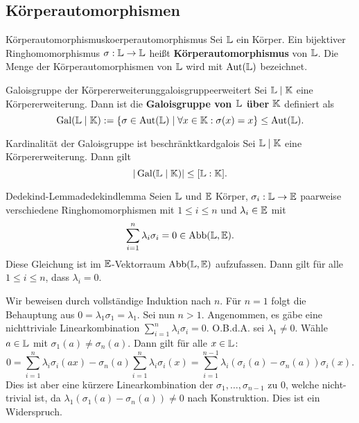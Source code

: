 \subsection{Körperautomorphismen}
\label{subsec:koerperautomorphismen}
\begin{definition}{Körperautomorphismus}{koerperautomorphismus}
Sei $\mathbb{L}$ ein Körper. Ein bijektiver Ringhomomorphismus $\sigma: \mathbb{L} \to \mathbb{L}$ heißt \textbf{Körperautomorphismus} von $\mathbb{L}$. Die Menge der Körperautomorphismen von $\mathbb{L}$ wird mit $\operatorname{\text{Aut}} (\mathbb{L})$ bezeichnet.
\end{definition}
\begin{definition}{Galoisgruppe der Körpererweiterung}{galoisgruppeerweitert}
Sei $\mathbb{L} \mid \mathbb{K}$ eine Körpererweiterung. Dann ist die \textbf{Galoisgruppe von $\mathbb{L}$ über $\mathbb{K}$} definiert als
\begin{equation}
\operatorname{\text{Gal}} (\mathbb{L} \mid \mathbb{K}) := \{\sigma \in \operatorname{\text{Aut}}(\mathbb{L}) \mid \forall x \in \mathbb{K}: \sigma(x) = x \}\leq \operatorname{\text{Aut}}(\mathbb{L}).
\end{equation}
\end{definition}
\begin{satz}{Kardinalität der Galoisgruppe ist beschränkt}{kardgalois}
Sei $\mathbb{L} \mid \mathbb{K}$ eine Körpererweiterung. Dann gilt
\begin{equation}
|\operatorname{\text{Gal}} (\mathbb{L} \mid \mathbb{K})| \leq [\mathbb{L} : \mathbb{K}].
\end{equation}
\end{satz}
\begin{lemma}{Dedekind-Lemma}{dedekindlemma}
Seien $\mathbb{L}$ und $\mathbb{E}$ Körper, $\sigma_i: \mathbb{L} \to \mathbb{E}$ paarweise verschiedene Ringhomomorphismen mit $1 \leq i \leq n$ und $\lambda_i \in \mathbb{E}$ mit
\begin{equation} 
\sum_{i=1}^n \lambda_i \sigma_i =0 \in \text{Abb} (\mathbb{L},\mathbb{E}).
\end{equation}
Diese Gleichung ist im $\mathbb{E}$-Vektorraum $\text{Abb}(\mathbb{L},\mathbb{E})$ aufzufassen. Dann gilt für alle $1 \leq i \leq n$, dass $\lambda_i =0$.
\end{lemma}
\begin{beweis}
Wir beweisen durch vollständige Induktion nach $n$. Für $n=1$ folgt die Behauptung aus $0 = \lambda_1 \sigma_1 = \lambda_1$. Sei nun $n>1$. Angenommen, es gäbe eine nichttriviale Linearkombination $\sum_{i=1}^n \lambda_i \sigma_i = 0$. O.B.d.A. sei $\lambda_1 \neq 0$. Wähle $a \in \mathbb{L}$ mit $\sigma_1(a)\neq \sigma_n(a)$. Dann gilt für alle $x \in \mathbb{L}$:
\begin{equation}
0 = \sum_{i=1}^n \lambda_i \sigma_i (ax) - \sigma_n(a) \sum_{i=1}^n \lambda_i \sigma_i (x) = \sum_{i=1}^{n-1} \lambda_i(\sigma_i(a)-\sigma_n(a))\sigma_i(x).
\end{equation} 
Dies ist aber eine kürzere Linearkombination der $\sigma_1, \dots, \sigma_{n-1}$ zu $0$, welche nicht-trivial ist, da $\lambda_1(\sigma_1(a)-\sigma_n(a))\neq 0$ nach Konstruktion. Dies ist ein Widerspruch.
\end{beweis}

